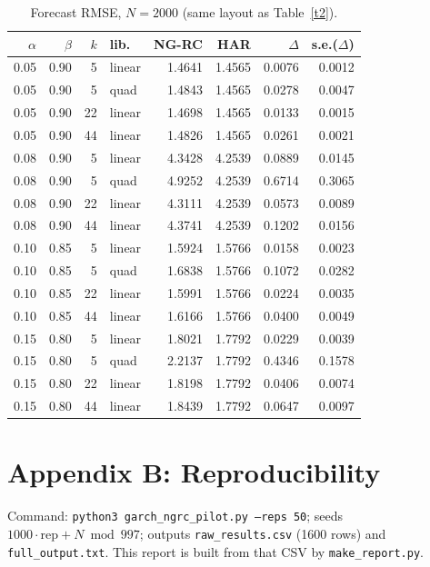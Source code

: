 \documentclass[11pt]{article}
\begin{document}
\begin{table}[!htbp]\centering\small\caption{Forecast RMSE, $N=2000$ (same layout as Table~\ref{t2}).}\begin{tabular}{rrrlrrrr}\hline$\alpha$&$\beta$&$k$&lib.&NG-RC&HAR&$\Delta$&s.e.($\Delta$)\\\hline
0.05 & 0.90 & 5 & linear & 1.4641 & 1.4565 & 0.0076 & 0.0012 \\
0.05 & 0.90 & 5 & quad & 1.4843 & 1.4565 & 0.0278 & 0.0047 \\
0.05 & 0.90 & 22 & linear & 1.4698 & 1.4565 & 0.0133 & 0.0015 \\
0.05 & 0.90 & 44 & linear & 1.4826 & 1.4565 & 0.0261 & 0.0021 \\
0.08 & 0.90 & 5 & linear & 4.3428 & 4.2539 & 0.0889 & 0.0145 \\
0.08 & 0.90 & 5 & quad & 4.9252 & 4.2539 & 0.6714 & 0.3065 \\
0.08 & 0.90 & 22 & linear & 4.3111 & 4.2539 & 0.0573 & 0.0089 \\
0.08 & 0.90 & 44 & linear & 4.3741 & 4.2539 & 0.1202 & 0.0156 \\
0.10 & 0.85 & 5 & linear & 1.5924 & 1.5766 & 0.0158 & 0.0023 \\
0.10 & 0.85 & 5 & quad & 1.6838 & 1.5766 & 0.1072 & 0.0282 \\
0.10 & 0.85 & 22 & linear & 1.5991 & 1.5766 & 0.0224 & 0.0035 \\
0.10 & 0.85 & 44 & linear & 1.6166 & 1.5766 & 0.0400 & 0.0049 \\
0.15 & 0.80 & 5 & linear & 1.8021 & 1.7792 & 0.0229 & 0.0039 \\
0.15 & 0.80 & 5 & quad & 2.2137 & 1.7792 & 0.4346 & 0.1578 \\
0.15 & 0.80 & 22 & linear & 1.8198 & 1.7792 & 0.0406 & 0.0074 \\
0.15 & 0.80 & 44 & linear & 1.8439 & 1.7792 & 0.0647 & 0.0097 \\
\hline\end{tabular}\end{table}
\section*{Appendix B: Reproducibility}
Command: \texttt{python3 garch\_ngrc\_pilot.py --reps 50}; seeds $1000\cdot\text{rep}+N\bmod 997$; outputs \texttt{raw\_results.csv} (1600 rows) and \texttt{full\_output.txt}. This report is built from that CSV by \texttt{make\_report.py}.
\end{document}
